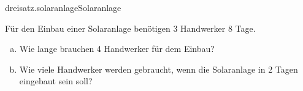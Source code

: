 \begin{exercise}{dreisatz.solaranlage}{Solaranlage}
  \ifproblem\problem\par
    Für den Einbau einer Solaranlage benötigen 3 Handwerker 8 Tage.
    \begin{enumerate}[a)]
      \item Wie lange brauchen 4 Handwerker für dem Einbau?
      \item Wie viele Handwerker werden gebraucht, wenn die Solaranlage in 2 Tagen eingebaut sein soll?
    \end{enumerate}
  \fi
\end{exercise}
